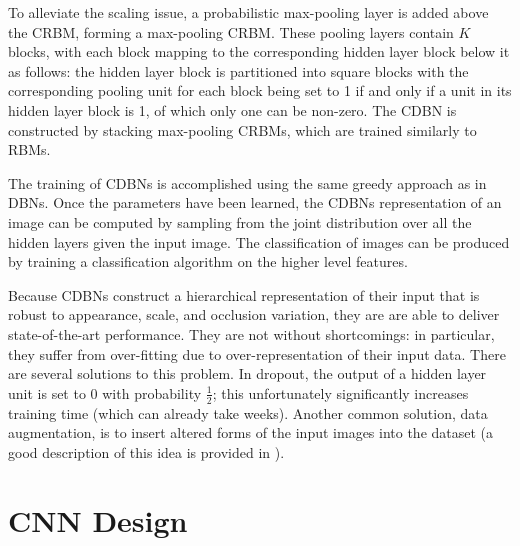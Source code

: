 \documentclass[10pt,twocolumn,letterpaper]{article}
\begin{document}
To alleviate the scaling issue, a probabilistic max-pooling layer is added above the CRBM,
forming a max-pooling CRBM.
These pooling layers contain $K$ blocks, with each block mapping to the corresponding hidden
layer block below it as follows: the hidden layer block is partitioned into square blocks with the
corresponding pooling unit for each block being set to 1 if and only if a unit in its hidden layer
block is 1, of which only one can be non-zero.
The CDBN is constructed by stacking max-pooling CRBMs, which are trained similarly to RBMs.

The training of CDBNs is accomplished using the same greedy approach as in DBNs.
Once the parameters have been learned, the CDBNs representation of an image can be computed
by sampling from the joint distribution over all the hidden layers given the input image.
The classification of images can be produced by training a classification algorithm
on the higher level features.

Because CDBNs construct a hierarchical representation of their input that is robust
to appearance, scale, and occlusion variation, they are are able to deliver
state-of-the-art performance.
They are not without shortcomings: in particular, they suffer from over-fitting due
to over-representation of their input data.
There are several solutions to this problem. In dropout, the output of a hidden layer
unit is set to 0 with probability $\frac{1}{2}$; this unfortunately significantly increases training
time (which can already take weeks). Another common solution, data augmentation,
is to insert altered forms of the input images into the dataset
(a good description of this idea is provided in \cite{Verydeep}).

\section{CNN Design}
\end{document}
